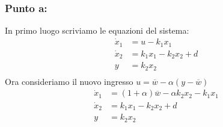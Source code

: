 \documentclass[a4paper]{report}
\begin{document}
\subsubsection*{Punto a:}
In primo luogo scriviamo le equazioni del sistema:
\begin{align*}
\dot{x}_1&=u-k_1x_1\\
\dot{x}_2&=k_1x_1-k_2x_2+d\\
y&=k_2x_2\\
\end{align*}
Ora consideriamo il nuovo ingresso $u=\overline{w}-\alpha (y-\overline{w})$
\begin{align*}
\dot{x}_1&=(1+\alpha)\overline{w}-\alpha k_2x_2-k_1x_1\\
\dot{x}_2&=k_1x_1-k_2x_2+d\\
y&=k_2x_2
\end{align*}
\end{document}
